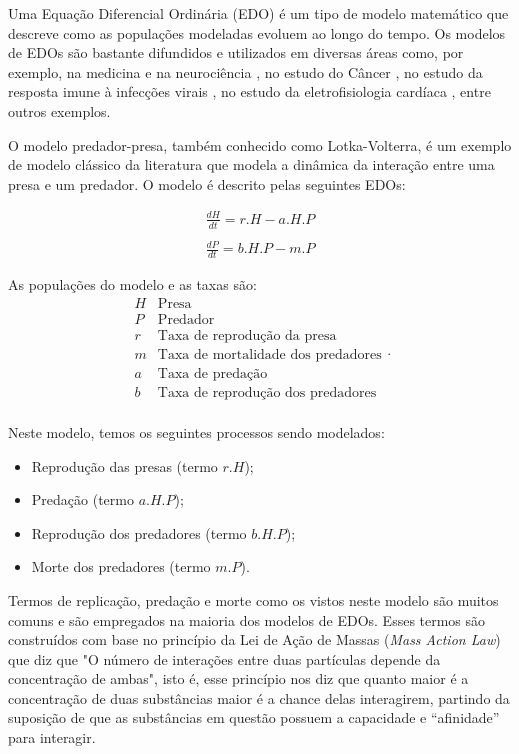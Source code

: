 \documentclass[
	12pt,				%
	openright,			%
	oneside,			%
	a4paper,			%
	main=brazil,
	english,			%
	]{ufsj-abntex2}
\begin{document}
Uma Equação Diferencial Ordinária (EDO) é um tipo de modelo matemático que descreve como as populações modeladas evoluem ao longo do tempo. Os modelos de EDOs são bastante difundidos e utilizados em diversas áreas como, por exemplo, na medicina e na neurociência \cite{ADOMIAN1995107}, no estudo do Câncer \cite{spencer2004ordinary, talkington2018ordinary}, no estudo da resposta imune à infecções virais \cite{reis2021validated}, no estudo da eletrofisiologia cardíaca \cite{VIGMOND20083, bucelli2022mathematical}, entre outros exemplos. 

O modelo predador-presa, também conhecido como Lotka-Volterra, é um exemplo de modelo clássico da literatura que modela a dinâmica da interação entre uma presa e um predador. O modelo é descrito pelas seguintes EDOs: 

\begin{equation}\label{eq:predadorpresa}
    \begin{array}{lr}
    \frac{dH}{dt} = r.H - a.H.P
    \\
    \\
    \frac{dP}{dt} = b.H.P - m.P
    \end{array}
\end{equation}

As populações do modelo e as taxas são: 
\[
    \begin{array}{lr}
    H & \text{Presa}\\
    P & \text{Predador}\\
    r & \text{Taxa de reprodução da presa}\\
    m & \text{Taxa de mortalidade dos predadores}\\
    a & \text{Taxa de predação}\\
    b & \text{Taxa de reprodução dos predadores}\\
    \end{array}.
\]

Neste modelo, temos os seguintes processos sendo modelados: 
\begin{itemize}
    \item Reprodução das presas (termo $r.H$);
    \item Predação (termo $a.H.P$);
    \item Reprodução dos predadores (termo $b.H.P$);
    \item Morte dos predadores (termo $m.P$). 
\end{itemize}

Termos de replicação, predação e morte como os vistos neste modelo são muitos comuns e são empregados na maioria dos modelos de EDOs. Esses termos são construídos com base no princípio da Lei de Ação de Massas (\textit{Mass Action Law}) que diz que "O número de interações entre duas partículas depende da concentração de ambas", isto é, esse princípio nos diz que quanto maior é a concentração de duas substâncias maior é a chance delas interagirem, partindo da suposição de que as substâncias em questão possuem a capacidade e ``afinidade'' para interagir.
\end{document}

